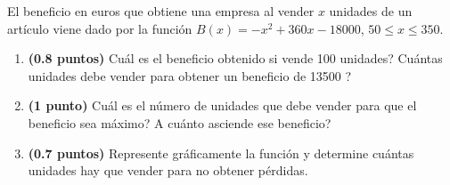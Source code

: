 
El beneficio en euros que obtiene una empresa al vender $x$ unidades de un artículo viene dado por la función $B(x)=-x^2+360x-18000$, $50\leq x\leq 350$.
\begin{enumerate}[label=\alph*)]
\item \textbf{(0.8 puntos)} \textquestiondown{}Cuál es el beneficio obtenido si vende 100 unidades? \textquestiondown{}Cuántas unidades debe vender para obtener un beneficio de 13500 \texteuro{}?
\item \textbf{(1 punto)} \textquestiondown{}Cuál es el número de unidades que debe vender para que el beneficio sea máximo? \textquestiondown{}A cuánto asciende ese beneficio?
\item \textbf{(0.7 puntos)} Represente gráficamente la función y determine cuántas unidades hay que vender para no obtener pérdidas.
\end{enumerate}
